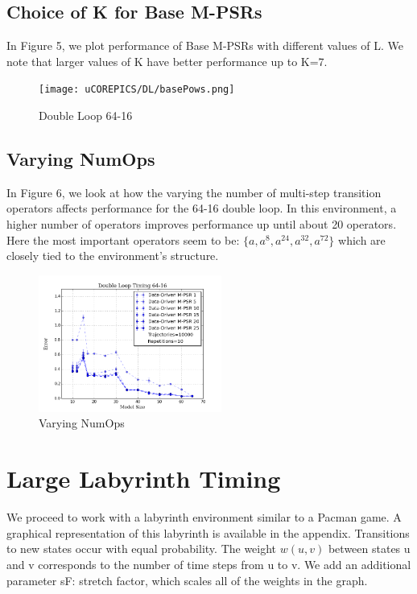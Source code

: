 \subsection{Choice of K for Base M-PSRs}

In Figure 5, we plot performance of Base M-PSRs with different values of L. We note that larger values of K have better performance up to K=7.

\begin{figure}[ht!]
\centering
\texttt{[image: uCOREPICS/DL/basePows.png]}
\caption{Double Loop 64-16\label{overflow}}
\end{figure}

\subsection{Varying NumOps}

In Figure 6, we look at how the varying the number of multi-step transition operators affects performance for the 64-16 double loop. In this environment, a higher number of operators improves performance up until about 20 operators. Here the most important operators seem to be: $\{a,a^{8},a^{24},a^{32},a^{72}\}$ which are closely tied to the environment's structure.

\begin{figure}[ht!]
\centering
\includegraphics[width=60mm]{uCOREPICS/DL/NumOpsTiming.png}
\caption{Varying NumOps\label{overflow}}
\end{figure} 

\section{Large Labyrinth Timing}

We proceed to work with a labyrinth environment similar to a Pacman game. A graphical representation of this labyrinth is available in the appendix. Transitions to new states occur with equal probability. The weight $w(u,v)$ between states u and v corresponds to the number of time steps from u to v. We add an additional parameter sF: stretch factor, which scales all of the weights in the graph. 

